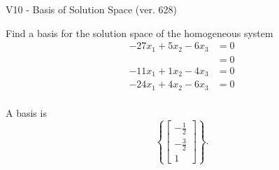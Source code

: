 \begin{exercise}
  \begin{exerciseTitle}V10 - Basis of Solution Space (ver. 628)\end{exerciseTitle}
  \begin{exerciseStatement}
    Find a basis for the solution space of the homogeneous system 
\begin{align*}
 -27 x_ 1 + 5 x_ 2 -6 x_ 3 &= 0  \\ 
  &= 0  \\ 
  -11 x_ 1 + 1 x_ 2 -4 x_ 3 &= 0  \\ 
  -24 x_ 1 + 4 x_ 2 -6 x_ 3 &= 0  \\ 
 \end{align*}


 
  \end{exerciseStatement}

  \begin{exerciseAnswer}
   A basis is   
\[\left\{\left[\begin{array}{c}
-\frac{1}{2} \\
-\frac{3}{2} \\
1
\end{array}\right]\right\}.\]

  


  \end{exerciseAnswer}
\end{exercise}